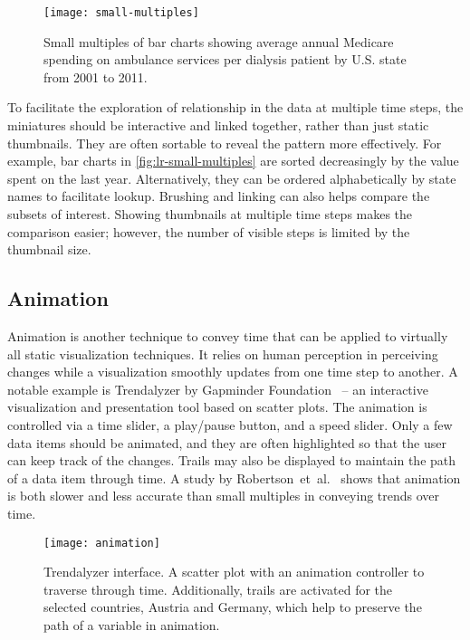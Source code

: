 \begin{figure}[!htb]
	\centering
	\texttt{[image: small-multiples]}
	\caption{Small multiples of bar charts showing average annual Medicare spending on ambulance services per dialysis patient by U.S. state from 2001 to 2011. }
	\label{fig:lr-small-multiples}
\end{figure}

To facilitate the exploration of relationship in the data at multiple time steps, the miniatures should be interactive and linked together, rather than just static thumbnails. They are often sortable to reveal the pattern more effectively. For example, bar charts in \autoref{fig:lr-small-multiples} are sorted decreasingly by the value spent on the last year. Alternatively, they can be ordered alphabetically by state names to facilitate lookup. Brushing and linking can also helps compare the subsets of interest. Showing thumbnails at multiple time steps makes the comparison easier; however, the number of visible steps is limited by the thumbnail size.

\subsection{Animation}
Animation is another technique to convey time that can be applied to virtually all static visualization techniques. It relies on human perception in perceiving changes while a visualization smoothly updates from one time step to another. A notable example is Trendalyzer by Gapminder Foundation~\cite{Gapminder} -- an interactive visualization and presentation tool based on scatter plots. The animation is controlled via a time slider, a play/pause button, and a speed slider. Only a few data items should be animated, and they are often highlighted so that the user can keep track of the changes. Trails may also be displayed to maintain the path of a data item through time. A study by Robertson~et~al.~\cite{Robertson2008} shows that animation is both slower and less accurate than small multiples in conveying trends over time.

\begin{figure}[!htb]
	\centering
	\texttt{[image: animation]}
	\caption{Trendalyzer interface. A scatter plot with an animation controller to traverse through time. Additionally, trails are activated for the selected countries, Austria and Germany, which help to preserve the path of a variable in animation. }
	\label{fig:lr-animation}
\end{figure}

